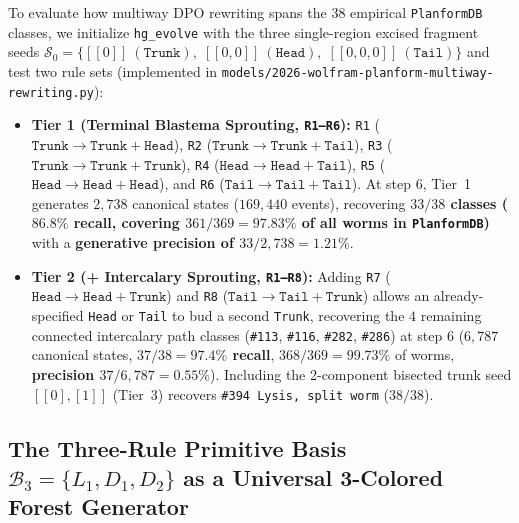 \documentclass[11pt,a4paper]{article}
\theoremstyle{definition}
\theoremstyle{remark}
\begin{document}
To evaluate how multiway DPO rewriting spans the $38$ empirical \texttt{PlanformDB} classes, we initialize \texttt{hg\_evolve} with the three single-region excised fragment seeds $\mathcal{S}_0 = \{[[0]]\ (\mathtt{Trunk}),\; [[0,0]]\ (\mathtt{Head}),\; [[0,0,0]]\ (\mathtt{Tail})\}$ and test two rule sets (implemented in \texttt{models/2026-wolfram-planform-multiway-rewriting.py}):
\begin{itemize}
  \item \textbf{Tier 1 (Terminal Blastema Sprouting, \texttt{R1--R6}):} \texttt{R1} ($\mathtt{Trunk} \to \mathtt{Trunk} + \mathtt{Head}$), \texttt{R2} ($\mathtt{Trunk} \to \mathtt{Trunk} + \mathtt{Tail}$), \texttt{R3} ($\mathtt{Trunk} \to \mathtt{Trunk} + \mathtt{Trunk}$), \texttt{R4} ($\mathtt{Head} \to \mathtt{Head} + \mathtt{Tail}$), \texttt{R5} ($\mathtt{Head} \to \mathtt{Head} + \mathtt{Head}$), and \texttt{R6} ($\mathtt{Tail} \to \mathtt{Tail} + \mathtt{Tail}$). At step $6$, Tier~1 generates $2{,}738$ canonical states ($169{,}440$ events), recovering \textbf{$33/38$ classes ($86.8\%$ recall, covering $361/369 = 97.83\%$ of all worms in \texttt{PlanformDB})} with a \textbf{generative precision of $33/2{,}738 = 1.21\%$}.
  \item \textbf{Tier 2 (+ Intercalary Sprouting, \texttt{R1--R8}):} Adding \texttt{R7} ($\mathtt{Head} \to \mathtt{Head} + \mathtt{Trunk}$) and \texttt{R8} ($\mathtt{Tail} \to \mathtt{Tail} + \mathtt{Trunk}$) allows an already-specified \texttt{Head} or \texttt{Tail} to bud a second \texttt{Trunk}, recovering the $4$ remaining connected intercalary path classes (\texttt{\#113}, \texttt{\#116}, \texttt{\#282}, \texttt{\#286}) at step $6$ ($6{,}787$ canonical states, \textbf{$37/38 = 97.4\%$ recall}, $368/369 = 99.73\%$ of worms, \textbf{precision $37/6{,}787 = 0.55\%$}). Including the 2-component bisected trunk seed $[[0], [1]]$ (Tier~3) recovers \texttt{\#394 Lysis, split worm} ($38/38$).
\end{itemize}

\subsection{The Three-Rule Primitive Basis $\mathcal{B}_3 = \{L_1, D_1, D_2\}$ as a Universal 3-Colored Forest Generator}
\end{document}
